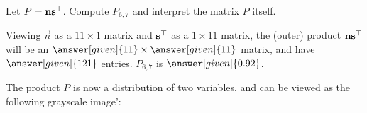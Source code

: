 \documentclass{ximera}
\begin{document}
\begin{example}[Distributions]
\begin{center}
  \end{center}
  Let $P = \mathbf{n}\mathbf{s}^\top$. Compute $P_{6,7}$ and interpret
  the matrix $P$ itself.
  \begin{explanation}
    Viewing $\vec{n}$ as a $11\times 1$ matrix and
    $\mathbf{s}^\top$ as a $1 \times 11$ matrix, the (outer) product
    $\mathbf{n}\mathbf{s}^\top$ will be an
    $\answer[given]{11}\times\answer[given]{11}$ matrix, and have
    $\answer[given]{121}$ entries. $P_{6,7}$ is
    $\answer[given]{0.92}$.

    The product $P$ is now a distribution of two variables, and can be
    viewed as the following grayscale image':
    \begin{center}
      \newcommand{\matrixData}{{
          {0,0,0.01,0.03,0.07,0.11,0.13,0.1,0.06,0.03,0.01},
          {0,0,0.02,0.06,0.13,0.22,0.25,0.21,0.13,0.06,0.02},
          {0,0,0.03,0.1,0.24,0.39,0.45,0.37,0.22,0.1,0.04},
          {0,0.01,0.04,0.15,0.35,0.58,0.67,0.55,0.33,0.15,0.05},
          {0,0.01,0.05,0.19,0.45,0.74,0.85,0.7,0.42,0.19,0.07},
          {0,0.01,0.06,0.21,0.49,0.8,0.92,0.76,0.46,0.21,0.07},
          {0,0.01,0.05,0.19,0.45,0.74,0.85,0.7,0.42,0.19,0.07},
          {0,0.01,0.04,0.15,0.35,0.58,0.67,0.55,0.33,0.15,0.05},
          {0,0,0.03,0.1,0.24,0.39,0.45,0.37,0.22,0.1,0.04},
          {0,0,0.02,0.06,0.13,0.22,0.25,0.21,0.13,0.06,0.02},
          {0,0,0.01,0.03,0.07,0.11,0.13,0.1,0.06,0.03,0.01}
      }}
      \newcommand{\skewData}{{
           {0., 0.01, 0.07, 0.26, 0.61, 1., 1.15, 0.95, 0.57, 0.26, 0.09}
      }}
      \newcommand{\normData}{{
          {0.11, 0.22, 0.39, 0.58, 0.74, 0.8, 0.74, 0.58, 0.39, 0.22, 0.11}
      }}
\end{center}
\end{explanation}
\end{example}
\end{document}
